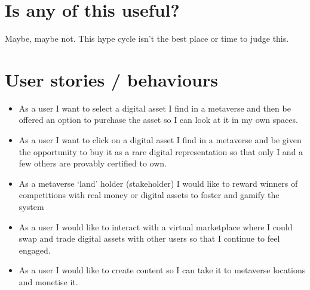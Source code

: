 \section{Is any of this useful?}
Maybe, maybe not. This hype cycle isn't the best place or time to judge this.
\section{User stories / behaviours}
\label{behaviours}

\begin{itemize}
\item As a user I want to select a digital asset I find in a metaverse and then be offered an option to purchase the asset so I can look at it in my own spaces.
\item As a user I want to click on a digital asset I find in a metaverse and be given the opportunity to buy it as a rare digital representation so that only I and a few others are provably certified to own.
\item As a metaverse `land' holder (stakeholder) I would like to reward winners of competitions with real money or digital assets to foster and gamify the system
\item As a user I would like to interact with a virtual marketplace where I could swap and trade digital assets with other users so that I continue to feel engaged.
\item As a user I would like to create content so I can take it to metaverse locations and monetise it.
\end{itemize}

